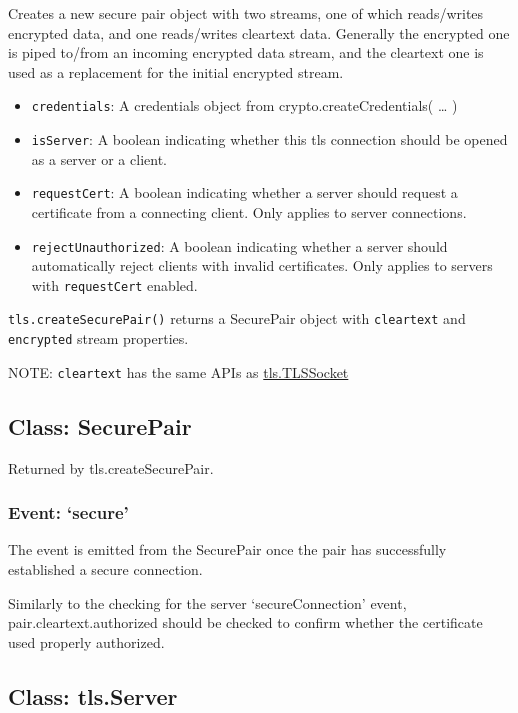Creates a new secure pair object with two streams, one of which
reads/writes encrypted data, and one reads/writes cleartext data.
Generally the encrypted one is piped to/from an incoming encrypted data
stream, and the cleartext one is used as a replacement for the initial
encrypted stream.

\begin{itemize}
\item
  \texttt{credentials}: A credentials object from
  crypto.createCredentials( \ldots{} )
\item
  \texttt{isServer}: A boolean indicating whether this tls connection
  should be opened as a server or a client.
\item
  \texttt{requestCert}: A boolean indicating whether a server should
  request a certificate from a connecting client. Only applies to server
  connections.
\item
  \texttt{rejectUnauthorized}: A boolean indicating whether a server
  should automatically reject clients with invalid certificates. Only
  applies to servers with \texttt{requestCert} enabled.
\end{itemize}

\texttt{tls.createSecurePair()} returns a SecurePair object with
\texttt{cleartext} and \texttt{encrypted} stream properties.

NOTE: \texttt{cleartext} has the same APIs as
\hyperref[tlsux5fclassux5ftlsux5ftlssocket]{tls.TLSSocket}

\subsection{Class: SecurePair}\label{class-securepair}

Returned by tls.createSecurePair.

\subsubsection{Event: `secure'}\label{event-secure}

The event is emitted from the SecurePair once the pair has successfully
established a secure connection.

Similarly to the checking for the server `secureConnection' event,
pair.cleartext.authorized should be checked to confirm whether the
certificate used properly authorized.

\subsection{Class: tls.Server}\label{class-tls.server}

